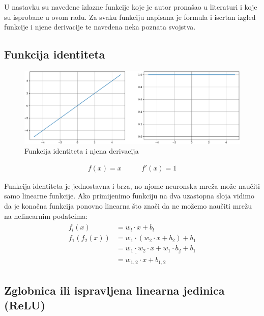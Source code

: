 \documentclass[times, utf8, diplomski]{fer}
\begin{document}
U nastavku su navedene izlazne funkcije koje je autor pronašao u literaturi i koje su isprobane u ovom radu. Za svaku funkciju napisana je formula i iscrtan izgled funkcije i njene derivacije te navedena neka poznata svojstva.

\subsection{Funkcija identiteta}

\begin{figure}[H]
\includegraphics[width=\textwidth]{Identity.pdf}
\centering
\caption{Funkcija identiteta i njena derivacija}
\label{fig:identity}
\end{figure}

\begin{equation}
\begin{split}
f(x) = x
\end{split}
\qquad
\begin{split}
f'(x) = 1
\end{split}
\end{equation}

Funkcija identiteta je jednostavna i brza, no njome neuronska mreža može naučiti samo linearne funkcije. Ako primijenimo funkciju na dva uzastopna sloja vidimo da je konačna funkcija ponovno linearna što znači da ne možemo naučiti mrežu na nelinearnim podatcima:
\begin{align}
\begin{split}
f_l(x) &= w_l \cdot x + b_l \\
f_1(f_2(x)) &= w_1 \cdot (w_2 \cdot x + b_2) + b_1 \\
&= \underline{w_1 \cdot w_2} \cdot x + \underline{w_1 \cdot b_2 + b_1} \\
&= w_{1,2} \cdot x + b_{1,2}
\end{split}
\end{align}

\subsection{Zglobnica ili ispravljena linearna jedinica (ReLU)}
\label{func:relu}
\end{document}
